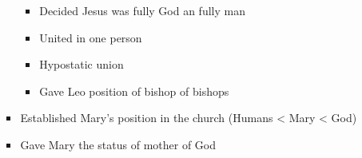 \documentclass[8pt]{article}
\begin{document}
\begin{enumerate}
\begin{enumerate}
\begin{itemize}
\begin{itemize}
                \item Decided Jesus was fully God an fully man
                \item United in one person
                \item Hypostatic union
                \item Gave Leo position of bishop of bishops
            \end{itemize}
            \item Established Mary's position in the church (Humans < Mary < God)
            \item Gave Mary the status of mother of God
        \end{itemize}
    \end{enumerate}



\end{enumerate}
\end{document}
